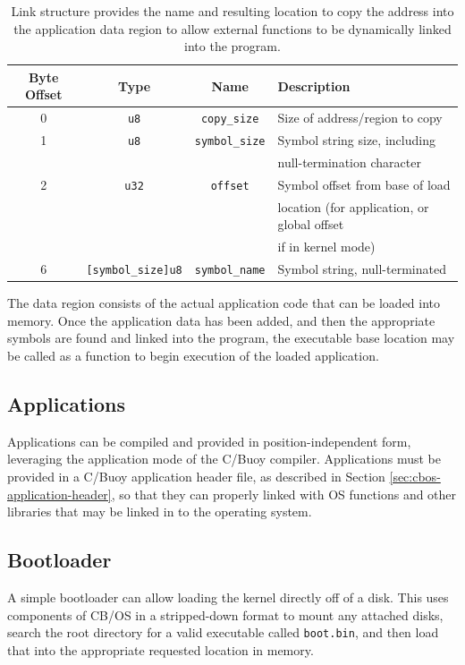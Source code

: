\documentclass{article}
\begin{document}
\begin{table}[h!]
	\centering
	\begin{tabular}{c|cc|l}
		\hline
		Byte Offset & Type & Name & Description \\
		\hline
		0 & \texttt{u8} & \texttt{copy\_size} & Size of address/region to copy \\
		1 & \texttt{u8} & \texttt{symbol\_size} & Symbol string size, including \\
		& & & null-termination character \\
		2 & \texttt{u32} & \texttt{offset} & Symbol offset from base of load \\
		& & & location (for application, or global offset \\
		& & & if in kernel mode) \\
		6 & \texttt{[symbol\_size]u8} & \texttt{symbol\_name} & Symbol string, null-terminated \\
		\hline
	\end{tabular}
	\caption{Link structure provides the name and resulting location to copy the address into the application data region to allow external functions to be dynamically linked into the program.}
	\label{table:cbfs-exec-link}
\end{table}

The data region consists of the actual application code that can be loaded into memory. Once the application data has been added, and then the appropriate symbols are found and linked into the program, the executable base location may be called as a function to begin execution of the loaded application.

\subsection{Applications}

Applications can be compiled and provided in position-independent form, leveraging the application mode of the C/Buoy compiler. Applications must be provided in a C/Buoy application header file, as described in Section \ref{sec:cbos-application-header}, so that they can properly linked with OS functions and other libraries that may be linked in to the operating system.

\subsection{Bootloader}

A simple bootloader can allow loading the kernel directly off of a disk. This uses components of CB/OS in a stripped-down format to mount any attached disks, search the root directory for a valid executable called \texttt{boot.bin}, and then load that into the appropriate requested location in memory.
\end{document}
